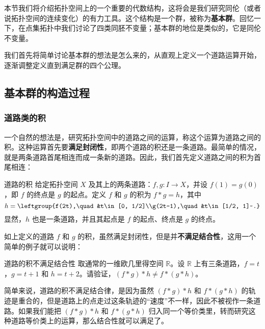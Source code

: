
本节我们将介绍拓扑空间上的一个重要的代数结构，这将会是我们研究同伦（或者说拓扑空间的连续变化）的有力工具。这个结构是一个群，被称为\textbf{基本群}。回忆一下，在点集拓扑中我们讨论了四类同胚不变量；基本群的地位是类似的，它是同伦不变量。

我们首先将简单讨论基本群的想法是怎么来的，从直观上定义一个道路运算开始，逐渐调整定义直到满足群的四个公理。

\subsection{基本群的构造过程}
\subsubsection{道路类的积}

一个自然的想法是，研究拓扑空间中的道路之间的运算，称这个运算为道路之间的积。这种运算首先要\textbf{满足封闭性}，即两个道路的积还是一条道路。最简单的情况，就是两条道路首尾相连而成一条新的道路。因此，我们首先定义道路之间的积为首尾相连：

\begin{definition}{道路的积}\label{def_HomT3_1}
给定拓扑空间 $X$ 及其上的两条道路：$f, g:I\rightarrow X$，并设 $f(1)=g(0)$，即 $f$ 的终点是 $g$ 的起点。定义 $f$ 和 $g$ 的积为 $f*g=h$，其中\begin{equation}h=\leftgroup{f(2t),\quad &t\in[0, 1/2]\\g(2t-1),\quad &t\in[1/2, 1]~.}\end{equation}
显然，$h$ 也是一条道路，并且其起点是 $f$ 的起点、终点是 $g$ 的终点。
\end{definition}

如上定义的道路 $f$ 和 $g$ 的积，虽然满足封闭性，但是并\textbf{不满足结合性}，这用一个简单的例子就可以说明：

\begin{exercise}{道路的积不满足结合性}
取通常的一维欧几里得空间 $\mathbb{R}$。设 $\mathbb{R}$ 上有三条道路，$f=t$，$g=t+1$ 和 $h=t+2$。请验证，$(f*g)*h\not=f*(g*h)$。
\end{exercise}

简单来说，道路的积不满足结合律，是因为虽然 $(f*g)*h$ 和 $f*(g*h)$ 的轨迹是重合的，但是道路上的点走过这条轨迹的“速度”不一样，因此不被视作一条道路。如果我们能把 $(f*g)*h$ 和 $f*(g*h)$ 归入同一个等价类里，转而研究这种道路等价类上的运算，那么结合性就可以满足了。

